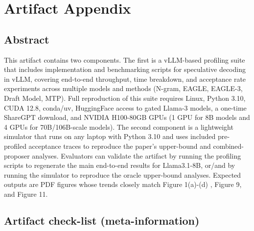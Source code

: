 \pagebreak
\section{Artifact Appendix}

\subsection{Abstract}

This artifact contains two components.
The first is a vLLM-based profiling suite that includes implementation and benchmarking scripts for speculative decoding in vLLM, covering end-to-end throughput, time breakdown, and acceptance rate experiments across multiple models and methods (N-gram, EAGLE, EAGLE-3, Draft Model, MTP). Full reproduction of this suite requires Linux, Python 3.10, CUDA 12.8, conda/uv, HuggingFace access to gated Llama-3 models, a one-time ShareGPT download, and NVIDIA H100-80GB GPUs (1 GPU for 8B models and 4 GPUs for 70B/106B-scale models).
The second component is a lightweight simulator that runs on any laptop with Python 3.10 and uses included pre-profiled acceptance traces to reproduce the paper’s upper-bound and combined-proposer analyses.
Evaluators can validate the artifact by running the profiling scripts to regenerate the main end-to-end results for Llama3.1-8B, or/and by running the simulator to reproduce the oracle upper-bound analyses. Expected outputs are PDF figures whose trends closely match Figure 1(a)-(d) , Figure 9, and Figure 11.

\subsection{Artifact check-list (meta-information)}

